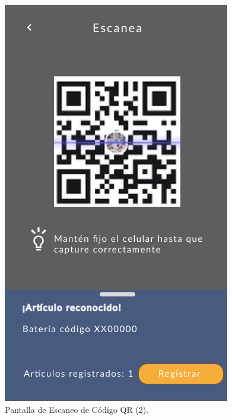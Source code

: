 \documentclass{scrreprt}
\begin{document}
    \begin{figure}[!htpb]
        \centerline{\includegraphics[scale=.35]{images/prototype/mobile/iPhone 8 - 5.png}}
        \caption{Pantalla de Escaneo de Código QR (2).}
        \label{fig}
    \end{figure}
    \FloatBarrier
\end{document}
